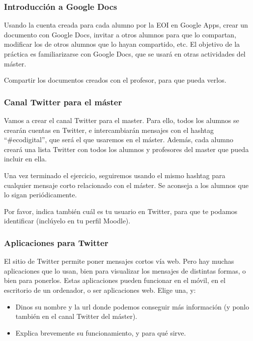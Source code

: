 \documentclass[a4paper,12pt]{article}
\begin{document}
\subsubsection{Introducción a Google Docs}
\label{sub:googledocs}

Usando la cuenta creada para cada alumno por la EOI en Google Apps, crear un documento con Google Docs, invitar a otros alumnos para que lo compartan, modificar los de otros alumnos que lo hayan compartido, etc. El objetivo de la práctica es familiarizarse con Google Docs, que se usará en otras actividades del máster.

Compartir los documentos creados con el profesor, para que pueda verlos.

\subsubsection{Canal Twitter para el máster}
\label{sub:canaltwitter}

Vamos a crear el canal Twitter para el master. Para ello, todos los alumnos se crearán cuentas en Twitter, e intercambiarán mensajes con el hashtag ``\#ecodigital'', que será el que usaremos en el máster. Además, cada alumno creará una lista Twitter con todos los alumnos y profesores del master que pueda incluir en ella.

Una vez terminado el ejercicio, seguiremos usando el mismo hashtag para cualquier mensaje corto relacionado con el máster. Se aconseja a los alumnos que lo sigan periódicamente.

Por favor, indica también cuál es tu usuario en Twitter, para que te podamos identificar (inclúyelo en tu perfil Moodle).

\subsubsection{Aplicaciones para Twitter}
\label{sub:apptwitter}

El sitio de Twitter permite poner mensajes cortos vía web. Pero hay muchas aplicaciones que lo usan, bien para visualizar los mensajes de distintas formas, o bien para ponerlos. Estas aplicaciones pueden funcionar en el móvil, en el escritorio de un ordenador, o ser aplicaciones web. Elige una, y:

\begin{itemize}
\item Dinos su nombre y la url donde podemos conseguir más información (y ponlo también en el canal Twitter del máster).
\item Explica brevemente su funcionamiento, y para qué sirve.
\end{itemize}
\end{document}
